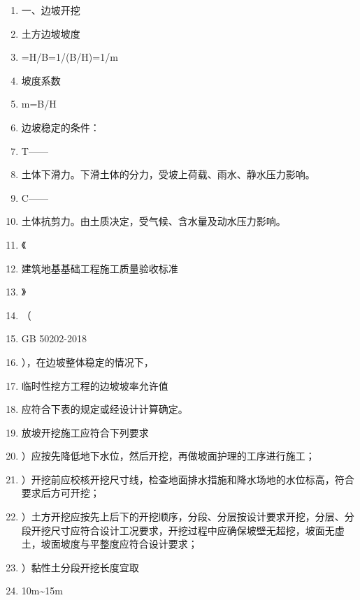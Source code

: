 \documentclass[UTF8,fontset=fandol,11pt]{ctexart}
\begin{document}
\begin{enumerate}[label=\arabic*.]

\item 一、边坡开挖

\item 土方边坡坡度

\item =H/B=1/(B/H)=1/m

\item 坡度系数

\item m=B/H

\item 边坡稳定的条件：

\item T——

\item 土体下滑力。下滑土体的分力，受坡上荷载、雨水、静水压力影响。

\item C——

\item 土体抗剪力。由土质决定，受气候、含水量及动水压力影响。

\item 《

\item 建筑地基基础工程施工质量验收标准

\item 》

\item （

\item GB 50202-2018

\item ），在边坡整体稳定的情况下，

\item 临时性挖方工程的边坡坡率允许值

\item 应符合下表的规定或经设计计算确定。

\item 放坡开挖施工应符合下列要求

\item ）应按先降低地下水位，然后开挖，再做坡面护理的工序进行施工；

\item ）开挖前应校核开挖尺寸线，检查地面排水措施和降水场地的水位标高，符合要求后方可开挖；

\item ）土方开挖应按先上后下的开挖顺序，分段、分层按设计要求开挖，分层、分段开挖尺寸应符合设计工况要求，开挖过程中应确保坡壁无超挖，坡面无虚土，坡面坡度与平整度应符合设计要求；

\item ）黏性土分段开挖长度宜取

\item 10m\textasciitilde{}15m

\end{enumerate}
\end{document}
